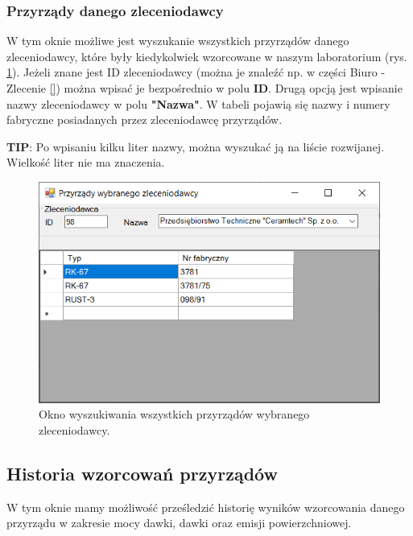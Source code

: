 \subsubsection{Przyrządy danego zleceniodawcy}
\label{przyrz_zleceniodawcy}

W tym oknie możliwe jest wyszukanie wszystkich przyrządów danego zleceniodawcy, które były kiedykolwiek wzorcowane w naszym laboratorium (rys. \ref{przyrzadyZleceniodawcy}). Jeżeli znane jest ID zleceniodawcy (można je znaleźć np. w części Biuro - Zlecenie \ref{}) można wpisać je bezpośrednio w polu \textbf{ID}. Drugą opcją jest wpisanie nazwy zleceniodawcy w polu \textbf{"Nazwa"}. W tabeli pojawią się nazwy i numery fabryczne posiadanych przez zleceniodawcę przyrządów.

\textbf{TIP}: Po wpisaniu kilku liter nazwy, można wyszukać ją na liście rozwijanej. Wielkość liter nie ma znaczenia.

\begin{figure}[htb]
	\centering
	\includegraphics{obrazki/Wyszukiwanie/Zleceniodawcy/przyrzady_zleceniodawcy.png}
	\caption{Okno wyszukiwania wszystkich przyrządów wybranego zleceniodawcy.}
	\label{przyrzadyZleceniodawcy}
\end{figure}
\subsection{Historia wzorcowań przyrządów}
\label{historia_wzorcowań}

W tym oknie mamy możliwość prześledzić historię wyników wzorcowania danego przyrządu w zakresie mocy dawki, dawki oraz emisji powierzchniowej.

